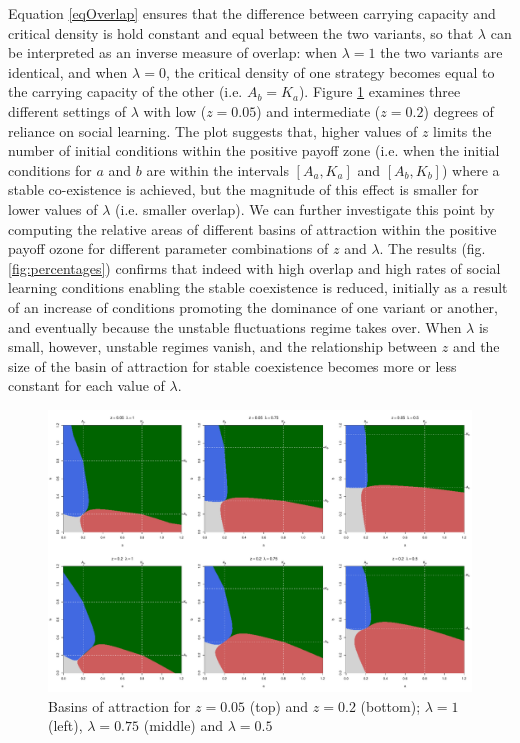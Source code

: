 \documentclass[review,authoryear]{elsarticle}
\begin{document}
Equation \eqref{eqOverlap} ensures that the difference between carrying capacity and critical density is hold constant and equal between the two variants, so that $\lambda$ can be interpreted as an inverse  measure of overlap: when $\lambda=1$ the two variants are identical, and when $\lambda=0$, the critical density of one strategy becomes equal to the carrying capacity of the other (i.e. $A_b=K_a$). Figure \ref{fig:overlap} examines three different settings of $\lambda$  with low ($z=0.05$) and intermediate ($z=0.2$) degrees of reliance on social learning. The plot suggests that, higher values of $z$ limits the number of initial conditions within the positive payoff zone (i.e. when the initial conditions for $a$ and $b$ are within the intervals $[A_a,K_a]$ and $[A_b,K_b]$) where a stable co-existence is achieved, but the magnitude of this effect is smaller for lower values of $\lambda$ (i.e. smaller overlap). We can further investigate this point by computing the relative areas of different basins of attraction within the positive payoff ozone for different parameter combinations of $z$ and $\lambda$. The results (fig. \ref{fig:percentages}) confirms that indeed with high overlap and high rates of social learning conditions enabling the stable coexistence is reduced, initially as a result of an increase of conditions promoting the dominance of one variant or another, and eventually because the unstable fluctuations regime takes over. When  $\lambda$ is small, however, unstable regimes vanish, and the relationship between $z$ and the size of the basin of attraction for stable coexistence becomes more or less constant for each value of $\lambda$. 

\begin{figure}
  \centering
      \includegraphics[width=\textwidth]{./figures/figure5}
  \caption{Basins of attraction for $z=0.05$ (top) and $z=0.2$ (bottom); $\lambda=1$ (left), $\lambda=0.75$ (middle) and $\lambda=0.5$}
    \label{fig:overlap}
\end{figure}
\end{document}
